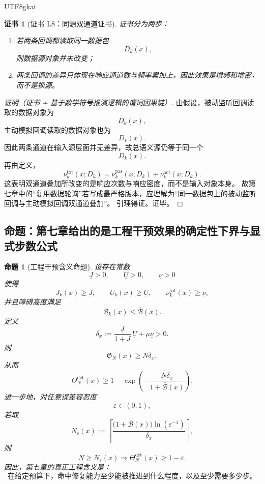 \documentclass[12pt]{article}
\newtheorem{proposition}{命题}[section]
\newtheorem{Certificate}{证书}[section]
\begin{document}
\begin{CJK*}{UTF8}{gkai}
\begin{Certificate}[证书 L8：同源双通道证书]
\label{cert:tex36-l8}
证书分为两步：
\begin{enumerate}
  \item 若两条回调都读取同一数据包
  \[
    D_k(x),
  \]
  则数据源对象并未改变；
  \item 两条回调的差异只体现在响应通道数与频率累加上，因此效果是增频和增密，而不是换源。
\end{enumerate}
\end{Certificate}

\begin{proof}[证明（证书 + 基于数学符号推演逻辑的谓词因果链）]
由假设，被动监听回调读取的数据对象为
\[
  D_k(x),
\]
主动模拟回调读取的数据对象也为
\[
  D_k(x).
\]
因此两条通道在输入源层面并无差异，故总语义源仍等于同一个
\[
  D_k(x).
\]
再由定义，
\[
  \nu_k^{\mathrm{tot}}(x;D_k)
  =
  \nu_k^{\mathrm{pas}}(x;D_k)
  +
  \nu_k^{\mathrm{act}}(x;D_k).
\]
这表明双通道叠加所改变的是响应次数与响应密度，而不是输入对象本身。
故第七章中的“复用数据轮询”若写成最严格版本，应理解为“同一数据包上的被动监听回调与主动模拟回调双通道叠加”。
引理得证。证毕。
\end{proof}

\subsection{命题：第七章给出的是工程干预效果的确定性下界与显式步数公式}
\label{subsec:tex36-ch8-proposition}

\begin{proposition}[工程干预含义命题]
\label{prop:tex36-ch8-engineering}
设存在常数
\[
  \underline J>0,\qquad
  \underline U>0,\qquad
  \underline \nu>0
\]
使得
\[
  J_k(x)\ge \underline J,\qquad
  U_k(x)\ge \underline U,\qquad
  \nu_k^{\mathrm{tot}}(x)\ge \underline \nu,
\]
并且障碍高度满足
\[
  \mathcal B_k(x)\le \overline{\mathcal B}(x).
\]
定义
\[
  \delta_x
  :=
  \frac{\underline J}{1+\underline J}\,\underline U
  +
  \mu\underline \nu
  >0.
\]
则
\[
  \mathfrak G_N(x)\ge N\delta_x,
\]
从而
\[
  \Theta_N^{\mathrm{det}}(x)
  \ge
  1-\exp\left(
    -\frac{N\delta_x}{1+\overline{\mathcal B}(x)}
  \right).
\]
进一步地，对任意误差容忍度
\[
  \varepsilon\in(0,1),
\]
若取
\[
  N_\varepsilon(x)
  :=
  \left\lceil
    \frac{
      \bigl(1+\overline{\mathcal B}(x)\bigr)\ln(\varepsilon^{-1})
    }{\delta_x}
  \right\rceil,
\]
则
\[
  N\ge N_\varepsilon(x)
  \Longrightarrow
  \Theta_N^{\mathrm{det}}(x)\ge 1-\varepsilon.
\]
因此，第七章的真正工程含义是：
\[
  \text{在给定预算下，命中修复能力至少能被推进到什么程度，以及至少需要多少步。}
\]
\end{proposition}


\end{CJK*}
\end{document}
